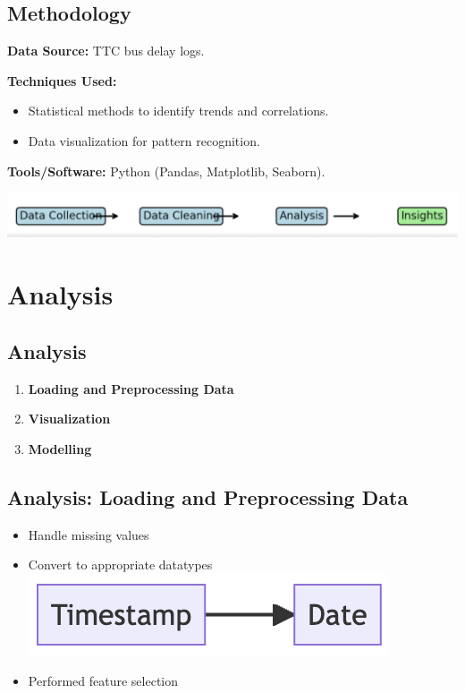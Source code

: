 \documentclass[
  letterpaper,
  DIV=11,
  numbers=noendperiod]{scrartcl}
\providecommand{\tightlist}{%
  \setlength{\itemsep}{0pt}\setlength{\parskip}{0pt}}\usepackage{longtable,booktabs,array}
\begin{document}
\subsection{Methodology}\label{methodology}

\textbf{Data Source:} TTC bus delay logs.

\textbf{Techniques Used:}

\begin{itemize}
\item
  Statistical methods to identify trends and correlations.
\item
  Data visualization for pattern recognition.
\end{itemize}

\textbf{Tools/Software:} Python (Pandas, Matplotlib, Seaborn).

\includegraphics{images/methodology.png}

\section{Analysis}\label{analysis}

\subsection{Analysis}\label{analysis-1}

\begin{enumerate}
\def\labelenumi{\arabic{enumi}.}
\tightlist
\item
  \textbf{Loading and Preprocessing Data}
\item
  \textbf{Visualization}
\item
  \textbf{Modelling}
\end{enumerate}

\subsection{Analysis: Loading and Preprocessing
Data}\label{analysis-loading-and-preprocessing-data}

\begin{itemize}
\tightlist
\item
  Handle missing values
\item
  Convert to appropriate datatypes
  \includegraphics{images/data_conversion.png}
\item
  Performed feature selection
\end{itemize}
\end{document}
